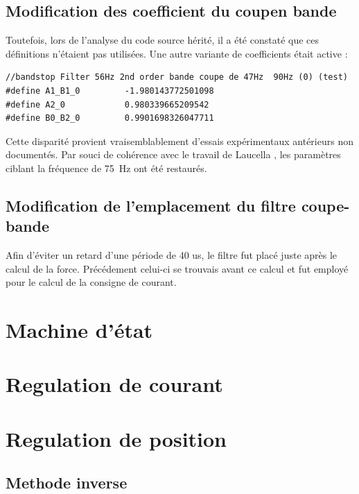 \subsection{Modification des coefficient du coupen bande}
Toutefois, lors de l'analyse du code source hérité, il a été constaté que ces définitions n'étaient pas utilisées. Une autre variante de coefficients était active :

\begin{verbatim}
//bandstop Filter 56Hz 2nd order bande coupe de 47Hz  90Hz (0) (test)
#define A1_B1_0         -1.980143772501098
#define A2_0            0.980339665209542
#define B0_B2_0         0.9901698326047711
\end{verbatim}

Cette disparité provient vraisemblablement d'essais expérimentaux antérieurs non documentés. Par souci de cohérence avec le travail de Laucella \cite{Laucella}, les paramètres ciblant la fréquence de 75~Hz ont été restaurés.

\subsection{Modification de l'emplacement du filtre coupe-bande}

Afin d'éviter un retard d'une période de 40 us, le filtre fut placé juste après le calcul de la force. Précédement celui-ci se trouvais avant ce calcul et fut employé pour le calcul de la consigne de courant.

\section{Machine d'état}

\section{Regulation de courant}

\section{Regulation de position}

\subsection{Methode inverse}




